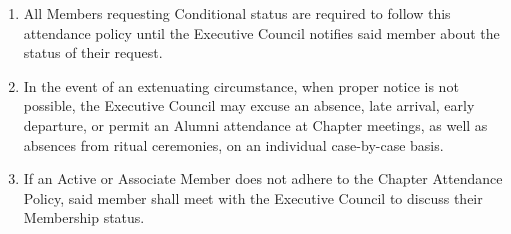 \documentclass[11pt]{article}
\begin{document}
\begin{enumerate}[label=\bfseries Article \Roman*]
\item
  All Members requesting Conditional status are required to follow this attendance policy until the Executive Council notifies said member about the status of their request.

\item
  In the event of an extenuating circumstance, when proper notice is not possible, the Executive Council may excuse an absence, late arrival, early departure, or permit an Alumni attendance at Chapter meetings, as well as absences from ritual ceremonies, on an individual case-by-case basis.

\item
  If an Active or Associate Member does not adhere to the Chapter Attendance Policy, said member shall meet with the Executive Council to discuss their Membership status.
\end{enumerate}
\end{document}
